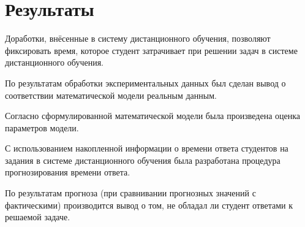  \chapter{Результаты}
 \label{ch5}

Доработки, внёсенные в систему дистанционного обучения, позволяют фиксировать время, которое студент затрачивает при решении задач в системе дистанционного обучения.

По результатам обработки экспериментальных данных был сделан вывод о соответствии математической модели реальным данным.

Согласно сформулированной математической модели была произведена оценка параметров модели.

С использованием накопленной информации о времени ответа студентов на задания в системе дистанционного обучения была разработана процедура прогнозирования времени ответа.

По результатам прогноза (при сравнивании прогнозных значений с фак\-тическими) производится вывод о том, не обладал ли студент ответами к решаемой задаче.
